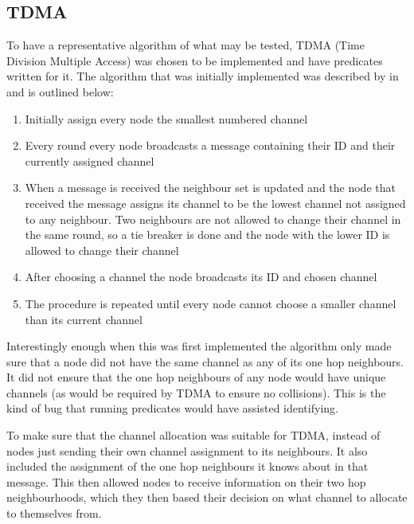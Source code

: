 
\subsection{TDMA}

To have a representative algorithm of what may be tested, TDMA (Time Division Multiple Access) was chosen to be implemented and have predicates written for it. The algorithm that was initially implemented was described by \citeauthor{DCATechReport} in \cite[p.~4]{DCATechReport} and is outlined below:

\begin{enumerate}
\item Initially assign every node the smallest numbered channel
\item Every round every node broadcasts a message containing their ID and their currently assigned channel
\item When a message is received the neighbour set is updated and the node that received the message assigns its channel to be the lowest channel not assigned to any neighbour. Two neighbours are not allowed to change their channel in the same round, so a tie breaker is done and the node with the lower ID is allowed to change their channel
\item After choosing a channel the node broadcasts its ID and chosen channel
\item The procedure is repeated until every node cannot choose a smaller channel than its current channel
\end{enumerate}

Interestingly enough when this was first implemented the algorithm only made sure that a node did not have the same channel as any of its one hop neighbours. It did not ensure that the one hop neighbours of any node would have unique channels (as would be required by TDMA to ensure no collisions). This is the kind of bug that running predicates would have assisted identifying.

To make sure that the channel allocation was suitable for TDMA, instead of nodes just sending their own channel assignment to its neighbours. It also included the assignment of the one hop neighbours it knows about in that message. This then allowed nodes to receive information on their two hop neighbourhoods, which they then based their decision on what channel to allocate to themselves from.


